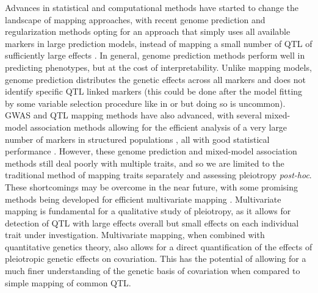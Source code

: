 \begin{refsection}
Advances in statistical and computational methods have started to change
the landscape of mapping approaches, with recent genome prediction and
regularization methods opting for an approach that simply uses all
available markers in large prediction models, instead of mapping a small
number of QTL of sufficiently large effects \parencite{Meuwissen2001-cu,De_Los_Campos2013-gn}.
In general, genome prediction methods
perform well in predicting phenotypes, but at the cost of
interpretability. Unlike mapping models, genome prediction distributes
the genetic effects across all markers and does not identify specific
QTL linked markers (this could be done after the model fitting by some
variable selection procedure like in \textcite{Piironen2015-ai} or \textcite{Moser2015-sm}
 but doing so is uncommon). GWAS and QTL
mapping methods have also advanced, with several mixed-model association
methods allowing for the efficient analysis of a very large number of
markers in structured populations \parencite{Lipka2012-tf,Zhou2012-zl,Lippert2011-jn}
, all with good statistical performance \parencite{Eu-Ahsunthornwattana2014-fn}.
However, these genome prediction and mixed-model association
methods still deal poorly with multiple traits, and so we are limited to
the traditional method of mapping traits separately and assessing
pleiotropy \emph{post-hoc}. These shortcomings may be overcome in the
near future, with some promising methods being developed for efficient
multivariate mapping \parencite{Pitchers2017-ge,Hannah2018-zh,Kemper2018-gi}.
Multivariate mapping is
fundamental for a qualitative study of pleiotropy, as it allows for
detection of QTL with large effects overall but small effects on each
individual trait under investigation. Multivariate mapping, when
combined with quantitative genetics theory, also allows for a direct
quantification of the effects of pleiotropic genetic effects on
covariation. This has the potential of allowing for a much finer
understanding of the genetic basis of covariation when compared to
simple mapping of common QTL.


\end{refsection}
